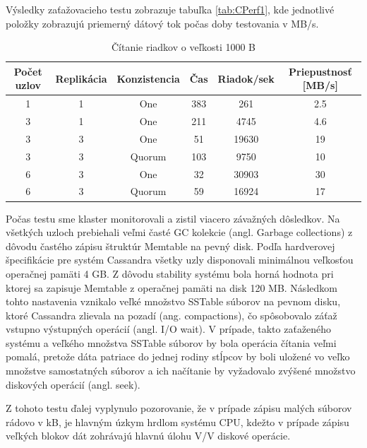 \documentclass[11pt,twoside,a4paper]{book}
\begin{document}
Výsledky zaťažovacieho testu zobrazuje tabuľka \ref{tab:CPerf1}, kde jednotlivé položky zobrazujú priemerný dátový tok počas doby testovania v MB/s.
\begin{table}[hp]
\begin{center}
\begin{tabular}{|c|c|c|c|c|c|}
\hline Počet uzlov & Replikácia & Konzistencia & Čas & Riadok/sek & Priepustnosť [MB/s]\\ 
\hline
\hline 1 & 1 & One & 383 & 261 & 2.5\\ 
\hline 3 & 1 & One & 211 & 4745 & 4.6\\ 
\hline 3 & 3 & One & 51 & 19630 & 19\\ 
\hline 3 & 3 & Quorum & 103 & 9750 & 10\\ 
\hline 6 & 3 & One & 32 & 30903 & 30\\ 
\hline 6 & 3 & Quorum & 59 & 16924 & 17\\ 
\hline
\end{tabular} 
\end{center}
\caption{Čítanie riadkov o veľkosti 1000 B}
\label{tab:CPerf3}
\end{table}
Počas testu sme klaster monitorovali a zistil viacero závažných dôsledkov. Na všetkých uzloch prebiehali veľmi časté GC kolekcie (angl. Garbage collections) z dôvodu častého zápisu štruktúr Memtable na pevný disk. Podľa hardverovej špecifikácie pre systém Cassandra všetky uzly disponovali minimálnou veľkosťou operačnej pamäti 4 GB. Z dôvodu stability systému bola horná hodnota pri ktorej sa zapisuje Memtable z operačnej pamäti na disk 120 MB. Následkom tohto nastavenia vznikalo veľké množstvo SSTable súborov na pevnom disku, ktoré Cassandra zlievala na pozadí (ang. compactions), čo spôsobovalo záťaž vstupno výstupných operácií (angl. I/O wait). V prípade, takto zaťaženého systému a veľkého množstva SSTable súborov by bola operácia čítania veľmi pomalá, pretože dáta patriace do jednej rodiny stĺpcov by boli uložené vo veľko množstve samostatných súborov a ich načítanie by vyžadovalo zvýšené množstvo diskových operácií (angl. seek).

Z tohoto testu ďalej vyplynulo pozorovanie, že v prípade zápisu malých súborov rádovo v kB, je hlavným úzkym hrdlom systému CPU, kdežto v prípade zápisu veľkých blokov dát zohrávajú hlavnú úlohu V/V diskové operácie.
\end{document}
